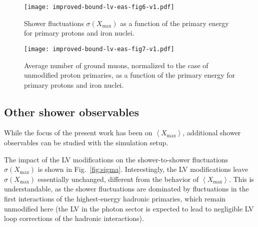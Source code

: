 \documentclass[aps,prd,preprint,longbibliography]{revtex4-1}
\begin{document}
\begin{figure}[p]  %
\centering
\texttt{[image: improved-bound-lv-eas-fig6-v1.pdf]}
\caption{Shower fluctuations $\sigma(X_\text{max})$ as a function of the primary
energy for primary protons and iron nuclei.}
\label{fig:sigma}%
\vspace*{5mm}
\centering
\texttt{[image: improved-bound-lv-eas-fig7-v1.pdf]}
\caption{Average number of ground muons, normalized to the case of unmodified
proton primaries, as a function of the primary energy
for primary protons and iron nuclei.}
\label{fig:muons}%
\end{figure}


\subsection{Other shower observables}
\label{subsec:others}
\vspace*{-0mm}

While the focus of the present work has been on $\left<X_\text{max}\right>$,
additional shower observables can be studied with the simulation setup.

The impact of the LV modifications on the shower-to-shower fluctuations
$\sigma(X_\text{max})$ is shown in Fig.~\ref{fig:sigma}.
Interestingly, the LV modifications leave $\sigma(X_\text{max})$  essentially unchanged, different from the behavior of $\left<X_\text{max}\right>$.
This is understandable, as the shower fluctuations are dominated by
fluctuations in the first interactions of the highest-energy hadronic primaries, which remain unmodified here
(the LV in the photon sector is expected to lead
to negligible LV loop corrections of the hadronic interactions).
\end{document}
